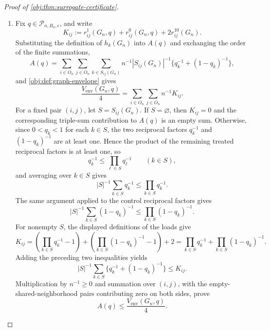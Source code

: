 \documentclass[11pt]{article}
\begin{document}
\begin{proof}[Proof of \cref{obj:thm:surrogate-certificate}]
\begin{enumerate}
\item Fix \(q\in\mathcal P_{n,B_n,\epsilon}\), and write
\[
K_{ij}:=r_{ij}^1(G_n,q)+r_{ij}^0(G_n,q)+2r_{ij}^{10}(G_n).
\]
Substituting the definition of \(h_k(G_n)\) into \(A(q)\) and exchanging the order of the finite summations,
\[
A(q)=\sum_{i\in O_n}\sum_{j\in O_n}\sum_{k\in S_{ij}(G_n)}
 n^{-1}|S_{ij}(G_n)|^{-1}
 \{q_k^{-1}+(1-q_k)^{-1}\},
\]
and \cref{obj:def:graph-envelope} gives
\[
\frac{V_{\mathrm{env}}(G_n,q)}4
=\sum_{i\in O_n}\sum_{j\in O_n}n^{-1}K_{ij}.
\]
For a fixed pair \((i,j)\), let \(S=S_{ij}(G_n)\).  If \(S=\varnothing\), then \(K_{ij}=0\) and the corresponding
triple-sum contribution to \(A(q)\) is an empty sum.  Otherwise, since \(0<q_k<1\) for each \(k\in S\), the two reciprocal factors
\(q_k^{-1}\) and \((1-q_k)^{-1}\) are at least one.  Hence the product of the remaining treated reciprocal factors is at least one, so
\[
q_k^{-1}\leq\prod_{\ell\in S}q_\ell^{-1}\qquad(k\in S),
\]
and averaging over \(k\in S\) gives
\[
|S|^{-1}\sum_{k\in S}q_k^{-1}\leq\prod_{k\in S}q_k^{-1}.
\]
The same argument applied to the control reciprocal factors gives
\[
|S|^{-1}\sum_{k\in S}(1-q_k)^{-1}\leq\prod_{k\in S}(1-q_k)^{-1}.
\]
For nonempty \(S\), the displayed definitions of the loads give
\[
K_{ij}=\left(\prod_{k\in S}q_k^{-1}-1\right)+\left(\prod_{k\in S}(1-q_k)^{-1}-1\right)+2
=\prod_{k\in S}q_k^{-1}+\prod_{k\in S}(1-q_k)^{-1}.
\]
Adding the preceding two inequalities yields
\[
|S|^{-1}\sum_{k\in S}\{q_k^{-1}+(1-q_k)^{-1}\}\leq K_{ij}.
\]
Multiplication by \(n^{-1}\geq0\) and summation over \((i,j)\), with the empty-shared-neighborhood pairs contributing zero on both sides, prove
\[
A(q)\leq \frac{V_{\mathrm{env}}(G_n,q)}4.
\]


\end{enumerate}
\end{proof}
\end{document}
